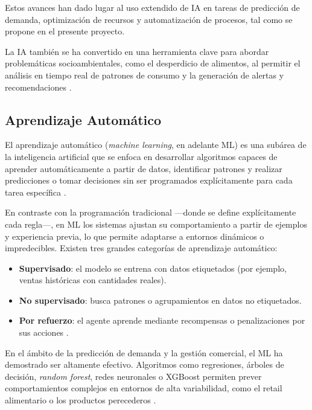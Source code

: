 Estos avances han dado lugar al uso extendido de IA en tareas de predicción de demanda, optimización de recursos y automatización de procesos, tal como se propone en el presente proyecto.

La IA también se ha convertido en una herramienta clave para abordar problemáticas socioambientales, como el desperdicio de alimentos, al permitir el análisis en tiempo real de patrones de consumo y la generación de alertas y recomendaciones \parencite{rolnick2019}.

\subsection{Aprendizaje Automático}

El aprendizaje automático (\textit{machine learning}, en adelante ML) es una subárea de la inteligencia artificial que se enfoca en desarrollar algoritmos capaces de aprender automáticamente a partir de datos, identificar patrones y realizar predicciones o tomar decisiones sin ser programados explícitamente para cada tarea específica \parencite{mitchell1997}.

En contraste con la programación tradicional —donde se define explícitamente cada regla—, en ML los sistemas ajustan su comportamiento a partir de ejemplos y experiencia previa, lo que permite adaptarse a entornos dinámicos o impredecibles. Existen tres grandes categorías de aprendizaje automático:

\begin{itemize}
    \item \textbf{Supervisado}: el modelo se entrena con datos etiquetados (por ejemplo, ventas históricas con cantidades reales).
    
    \item \textbf{No supervisado}: busca patrones o agrupamientos en datos no etiquetados.
    
    \item \textbf{Por refuerzo}: el agente aprende mediante recompensas o penalizaciones por sus acciones \parencite{sutton2018}.
\end{itemize}

En el ámbito de la predicción de demanda y la gestión comercial, el ML ha demostrado ser altamente efectivo. Algoritmos como regresiones, árboles de decisión, \textit{random forest}, redes neuronales o XGBoost permiten prever comportamientos complejos en entornos de alta variabilidad, como el retail alimentario o los productos perecederos \parencite{carbonneau2008}.


